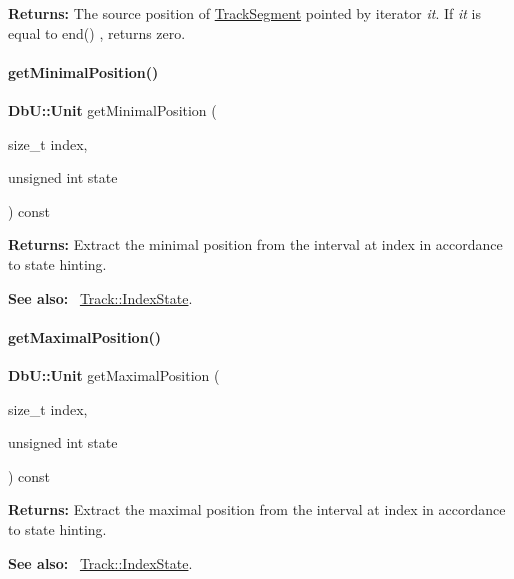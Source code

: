 {\bfseries Returns\+:} The source position of \hyperlink{classKite_1_1TrackSegment}{Track\+Segment} pointed by iterator {\itshape it}. If {\itshape it} is equal to {\ttfamily end()} , returns zero. \mbox{\label{classKite_1_1Track_a22b708f606d8d95b52e297d7bc2cab55}} 
\paragraph{\texorpdfstring{get\+Minimal\+Position()}{getMinimalPosition()}}
{\footnotesize\ttfamily \textbf{ Db\+U\+::\+Unit} get\+Minimal\+Position (\begin{DoxyParamCaption}\item[{size\+\_\+t}]{index,  }\item[{unsigned int}]{state }\end{DoxyParamCaption}) const}

{\bfseries Returns\+:} Extract the minimal position from the interval at {\ttfamily index} in accordance to {\ttfamily state} hinting.

{\bfseries See also\+:}~ \hyperlink{classKite_1_1Track_af4bdc8469c0fee386fc2ff30e0666bca}{Track\+::\+Index\+State}. \mbox{\label{classKite_1_1Track_a68124797edd88ebaf3c9aa00d6ee7822}} 
\paragraph{\texorpdfstring{get\+Maximal\+Position()}{getMaximalPosition()}}
{\footnotesize\ttfamily \textbf{ Db\+U\+::\+Unit} get\+Maximal\+Position (\begin{DoxyParamCaption}\item[{size\+\_\+t}]{index,  }\item[{unsigned int}]{state }\end{DoxyParamCaption}) const}

{\bfseries Returns\+:} Extract the maximal position from the interval at {\ttfamily index} in accordance to {\ttfamily state} hinting.

{\bfseries See also\+:}~ \hyperlink{classKite_1_1Track_af4bdc8469c0fee386fc2ff30e0666bca}{Track\+::\+Index\+State}. \mbox{\label{classKite_1_1Track_aa9c09467d45d95b3ac2b58f09c04ff8d}} 
